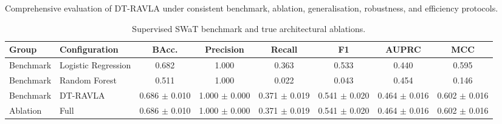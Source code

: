 \begin{table}[t]
\centering
\caption{Comprehensive evaluation of DT-RAVLA under consistent benchmark, ablation, generalisation, robustness, and efficiency protocols.}
\label{tab:comprehensive_results}
\renewcommand{\arraystretch}{1.10}
\setlength{\tabcolsep}{3.2pt}

\begin{subtable}{\textwidth}
\centering
\caption{Supervised SWaT benchmark and true architectural ablations.}
\label{tab:benchmark_ablation_subtable}
\begin{tabular}{llcccccc}
\hline
Group & Configuration & BAcc. & Precision & Recall & F1 & AUPRC & MCC \\
\hline
Benchmark & Logistic Regression & 0.682 & 1.000 & 0.363 & 0.533 & 0.440 & 0.595 \\
Benchmark & Random Forest & 0.511 & 1.000 & 0.022 & 0.043 & 0.454 & 0.146 \\
Benchmark & DT-RAVLA & 0.686 $\pm$ 0.010 & 1.000 $\pm$ 0.000 & 0.371 $\pm$ 0.019 & 0.541 $\pm$ 0.020 & 0.464 $\pm$ 0.016 & 0.602 $\pm$ 0.016 \\
Ablation & Full & 0.686 $\pm$ 0.010 & 1.000 $\pm$ 0.000 & 0.371 $\pm$ 0.019 & 0.541 $\pm$ 0.020 & 0.464 $\pm$ 0.016 & 0.602 $\pm$ 0.016 \\
\hline
\end{tabular}
\end{subtable}
\vspace{1.5mm}


\end{table}
